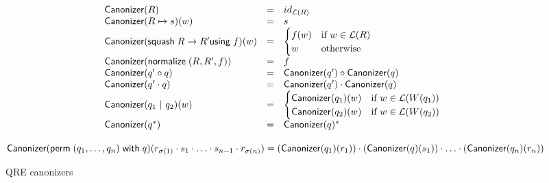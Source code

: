 \documentclass{svproc}
\newcommand{\kw}[1]{\ensuremath{\mathsf{#1}}}
\newcommand{\squash}[3]{\ensuremath{\kw{squash} \; #1 \rightarrow #2
\kw{using} \; #3}}
\newcommand{\perm}[2]{\ensuremath{\kw{perm}\; (#1)\; \kw{with}\; #2}}
\newcommand{\normalize}[3]{\ensuremath{\kw{normalize} \; (#1, #2, #3)}}
\newcommand{\sep}{\ensuremath{\ | \ }}
\newcommand{\canonizer}{\ensuremath{\kw{Canonizer}}}
\begin{document}
\begin{figure}[t]
  \begin{center}
\[
    \begin{array}{l@\quad l @\quad l} 
      \canonizer(R) &=& id_{\mathcal{L}(R)} \\
      \canonizer(R \mapsto s)(w) &=& s\\
      \canonizer(\squash{R}{R'}{f})(w) &=& 
\begin{cases}
f(w) & \text{if } w \in \mathcal{L}(R)\\
w & \text{otherwise}
\end{cases}\\
      \canonizer(\normalize{R}{R'}{f}) &=& f\\
      \canonizer(q' \circ q) &=& \canonizer(q') \circ \canonizer(q)\\
      \canonizer(q' \cdot q) &=& \canonizer(q') \cdot \canonizer(q)\\
      \canonizer(q_1 \sep q_2)(w) &=& 
\begin{cases}
\canonizer(q_1)(w) & \text{if } w \in \mathcal{L}(W(q_1))\\
\canonizer(q_2)(w) & \text{if } w \in \mathcal{L}(W(q_2))\\
\end{cases}\\
      \canonizer(q^*) &=& \canonizer(q)^* \\
    \end{array}
    \]
    \end{center}
    $\canonizer(\perm{q_1, \ldots, q_n}{q})(r_{\sigma(1)}
\cdot s_1 \cdot \ldots \cdot s_{n-1} \cdot r_{\sigma(n)}) \newline
= (\canonizer(q_1)(r_1)) \cdot (\canonizer(q)(s_1)) \cdot \ldots \cdot
(\canonizer(q_n)(r_n))$
  \caption{QRE canonizers}
  \label{fig:canonizers}
\end{figure}
\end{document}
